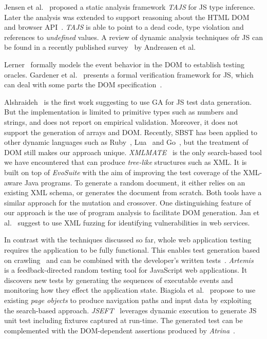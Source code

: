 
Jensen et al.~\cite{tajs2009} proposed a static analysis framework \emph{TAJS} for JS type inference. Later the analysis was extended to support reasoning about the HTML DOM and browser API~\cite{dom2011}. \emph{TAJS} is able to point to a dead code, type violation and references to \emph{undefined} values. A review of dynamic analysis techniques ofr JS can be found in a recently published survey~\cite{andreasen2017survey} by Andreasen et al.

Lerner~\cite{lerner2012modeling} formally models the event behavior in the DOM to establish testing oracles. Gardener et al.~\cite{gardner2012towards} presents a formal verification framework for JS, which can deal with some parts the DOM specification~\cite{gardner2008local}.

Alshraideh~\cite{alshraideh2008complete} is the first work suggesting to use GA for JS test data generation. But the implementation is limited to primitive types such as numbers and strings, and does not report on empirical validation. Moreover, it does not support the generation of arrays and DOM. Recently, SBST has been applied to other dynamic languages such as Ruby~\cite{mairhofer2011search}, Lua~\cite{wibowo2015unit} and Go~\cite{irawan2016test}, but the treatment of DOM still makes our approach unique. \emph{XMLMATE}~\cite{havrikov2014xmlmate} is the only search-based tool we have encountered that can produce \emph{tree-like} structures such as XML. It is built on top of \emph{EvoSuite} with the aim of improving the test coverage of the XML-aware Java programs. To generate a random document, it either relies on an existing XML schema, or generates the document from scratch. Both tools have a similar approach for the mutation and crossover. One distinguishing feature of our approach is the use of program analysis to facilitate DOM generation. Jan et al.~\cite{jan2016automated} suggest to use XML fuzzing for identifying vulnerabilities in web services.

In contrast with the techniques discussed so far, whole web application testing requires the application to be fully functional. This enables test generation based on crawling~\cite{mesbah2012invariant} and can be combined with the developer's written tests~\cite{milani2014leveraging}. \emph{Artemis}~\cite{artemis2011} is a feedback-directed random testing tool for JavaScript web applications. It discovers new tests by generating the sequences of executable events and monitoring how they effect the application state. Biagiola et al.~\cite{biagiola2017search} propose to use existing \emph{page objects} to produce navigation paths and input data by exploiting the search-based approach. \emph{JSEFT}~\cite{mirshokraie2015jseft} leverages dynamic execution to generate JS unit test including fixtures captured at run-time. The generated test can be complemented with the DOM-dependent assertions produced by \emph{Atrina}~\cite{icst16}.

